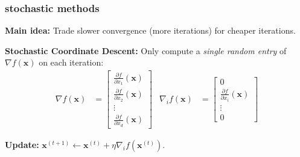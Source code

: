 \documentclass[compress]{beamer}
\newcommand{\bv}[1]{\mathbf{#1}}
\begin{document}
\begin{frame}
	\frametitle{stochastic methods}
	\textbf{Main idea:} Trade slower convergence (more iterations) for cheaper iterations. 
	\vspace{2em}
	
	\textbf{Stochastic \alert{Coordinate Descent}:}
	Only compute a \emph{single random entry} of $\nabla f(\bv{x})$ on each iteration:
	\begin{align*}
		\nabla f(\bv{x}) &= 
		\begin{bmatrix}
			\frac{\partial f}{\partial x_1}(\bv{x}) \\ \frac{\partial f}{\partial x_2}(\bv{x}) \\ \vdots \\ \frac{\partial f}{\partial x_d}(\bv{x})  
		\end{bmatrix} & 	\nabla_i f(\bv{x}) &= 
		\begin{bmatrix}
			0\\ \frac{\partial f}{\partial x_i}(\bv{x}) \\ \vdots \\ 0
		\end{bmatrix} 
	\end{align*}
	
	\textbf{Update:} $\bv{x}^{(t+1)}\leftarrow \bv{x}^{(t)} + \eta \nabla_i f(\bv{x}^{(t)})$.
\end{frame}
\end{document}
